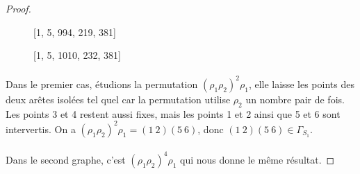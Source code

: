 \begin{proof}
\begin{figure}[H]
\begin{center}
\begin{tikzpicture}
      \end{tikzpicture}
      \caption{[1, 5, 994, 219, 381]}
    \end{center}
  \end{figure}

  \begin{figure}[H]
    \begin{center}
      \caption{[1, 5, 1010, 232, 381]}
    \end{center}
  \end{figure}

  \paragraph{}
  Dans le premier cas, étudions la permutation $(\rho_1\rho_2)^2\rho_1$, elle laisse les points des deux arêtes isolées tel quel car la permutation utilise $\rho_2$ un nombre pair de fois. Les points 3 et 4 restent aussi fixes, mais les points 1 et 2 ainsi que 5 et 6 sont intervertis. On a $(\rho_1\rho_2)^2\rho_1 = (1\ 2)(5\ 6)$, donc $(1\ 2)(5\ 6) \in \Gamma_{S_1}$.

  \paragraph{}
  Dans le second graphe, c'est $(\rho_1\rho_2)^4\rho_1$ qui nous donne le même résultat.


\end{proof}
